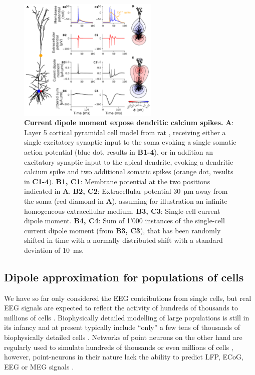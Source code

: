 \documentclass[preprint,10pt,authoryear]{elsarticle}
\begin{document}
\begin{figure}[H]
	\centering
	\includegraphics[width=0.6\textwidth]{ca_spike_hay}
	\caption{\textbf{Current dipole moment expose dendritic calcium spikes.}
	\textbf{A}: Layer 5 cortical pyramidal cell model from rat \citep{HAY2011}, receiving either a single excitatory synaptic input to the soma evoking a single somatic action potential (blue dot, results in \textbf{B1-4}), or in addition an excitatory synaptic input to the apical dendrite, evoking a dendritic calcium spike and two additional somatic spikes (orange dot, results in \textbf{C1-4}). 
	\textbf{B1, C1}: Membrane potential at the two positions indicated in \textbf{A}.
	\textbf{B2, C2}: Extracellular potential 30~$\si{\um}$ away from the soma (red diamond in \textbf{A}), assuming for illustration an infinite homogeneous extracellular medium. 
	\textbf{B3, C3}: Single-cell current dipole moment. 
	\textbf{B4, C4}: Sum of 1'000 instances of the single-cell current dipole moment (from \textbf{B3, C3}), that has been randomly shifted in time with a normally distributed shift with a standard deviation of 10~ms.
	}
	\label{fig:ca_spike}
\end{figure}

\subsection{Dipole approximation for populations of cells}
We have so far only considered the EEG contributions from single cells, but real EEG signals are expected to reflect the activity of hundreds of thousands to millions of cells \citep{NUNEZ2006, COHEN2017}. 
Biophysically detailed modelling of large populations is still in its infancy \citep{EINEVOLL2019} and at present typically include ``only'' a few tens of thousands of biophysically detailed cells \citep{MARKRAM2015, BILLEH2019}. Networks of point neurons on the other hand are regularly used to simulate hundreds of thousands \citep{BILLEH2019} or even millions of cells \citep{SENK2018, SCHMIDT2018}, however, point-neurons in their nature lack the ability to predict LFP, ECoG, EEG or MEG signals \citep{EINEVOLL2013REVIEW}.  
\end{document}
